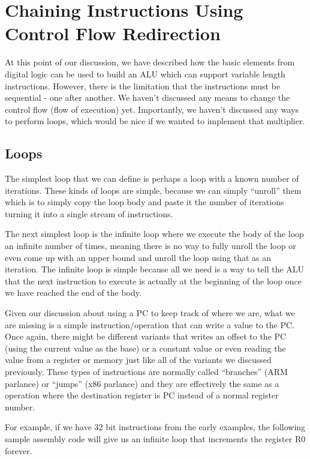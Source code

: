 \section{Chaining Instructions Using Control Flow Redirection}

At this point of our discussion, we have described how the basic elements from digital logic can be used to build an ALU which can support variable length instructions. However, there is the limitation that the instructions must be sequential - one after another. We haven’t discussed any means to change the control flow (flow of execution) yet. Importantly, we haven’t discussed any ways to perform loops, which would be nice if we wanted to implement that multiplier.

\subsection{Loops}

The simplest loop that we can define is perhaps a loop with a known number of iterations. These kinds of loops are simple, because we can simply “unroll” them which is to simply copy the loop body and paste it the number of iterations turning it into a single stream of instructions.

The next simplest loop is the infinite loop where we execute the body of the loop an infinite number of times, meaning there is no way to fully unroll the loop or even come up with an upper bound and unroll the loop using that as an iteration. The infinite loop is simple because all we need is a way to tell the ALU that the next instruction to execute is actually at the beginning of the loop once we have reached the end of the body. 

Given our discussion about using a PC to keep track of where we are, what we are missing is a simple instruction/operation that can write a value to the PC. Once again, there might be different variants that writes an offset to the PC (using the current value as the base) or a constant value or even reading the value from a register or memory just like all of the variants we discussed previously. These types of instructions are normally called “branches” (ARM parlance) or “jumps” (x86 parlance) and they are effectively the same as a  operation where the destination register is PC instead of a normal register number.

For example, if we have 32 bit instructions from the early examples, the following sample assembly code will give us an infinite loop that increments the register R0 forever.

